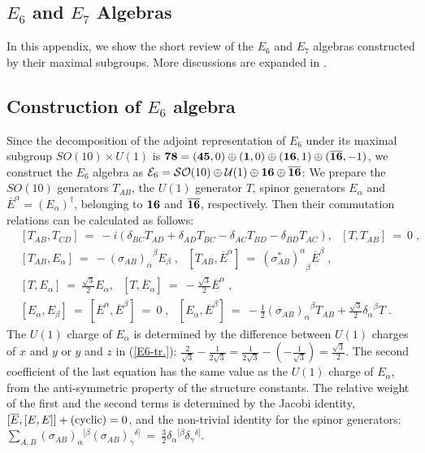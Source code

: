\documentclass[a4paper,11pt]{article}
\newcommand{\half}{\frac{1}{2}}
\newcommand{\ol}{\overline}
\begin{document}
{\begin{appendix}

\section{$E_6$ and $E_7$ Algebras} \label{e-algebra}

In this appendix, 
we show the short review of the $E_6$ and $E_7$ algebras 
constructed by their maximal subgroups.
More discussions are expanded in \cite{IKK2,KS,HN1}. 



\subsection{Construction of $E_6$ algebra}

Since the decomposition of the adjoint representation of $E_6$ under its
maximal subgroup $SO(10) \times U(1)$ is 
${\bf 78} = ({\bf 45},0) \oplus ({\bf 1},0)
\oplus({\bf 16},1)\oplus ({\bf \ol{16}},-1)$, 
we construct the $E_6$ algebra as 
${\cal E}_6 = {\cal SO}(10) \oplus {\cal U}(1) 
\oplus {\bf 16} \oplus {\bf \ol{16}}$: 
We prepare the $SO(10)$ generators $T_{AB}$, 
the $U(1)$ generator $T$, 
spinor generators $E_{\alpha}$ and 
$\ol{E}^{\alpha} = (E_{\alpha})^{\dagger}$,
belonging to ${\bf 16}$ and $\ol{\bf 16}$, respectively.
Then their commutation relations can be calculated 
as follows: 
\begin{align}
&[T_{AB} , T_{CD}] 
 \ = \ -i (\delta_{BC} T_{AD} + \delta_{AD} T_{BC}
    - \delta_{AC} T_{BD} - \delta_{BD} T_{AC}) , 
   \ \ \ [T, T_{AB}] \ = \ 0 \; , \nonumber \\
&[T_{AB} , E_{\alpha}] 
  \ = \ - {({\sigma_{AB}})_{\alpha}}^{\beta} E_{\beta} \; , 
\ \ \ [T_{AB},\ol{E}^{\alpha}] 
\ = \ {({\sigma^*_{AB}})^{\alpha}}_{\beta} \ol{E}^{\beta} \; ,
 \nonumber \\
&[T, E_{\alpha}] \ = \ \frac{\sqrt{3}}{2} E_{\alpha}, 
\ \ \  [T, \ol{E}_{\alpha}] \ = \ - \frac{\sqrt{3}}{2} \ol{E}^{\alpha}
 \; , \nonumber \\
&[E_{\alpha},E_{\beta}] 
  \ = \ [\ol{E}^{\alpha},\ol{E}^{\beta} ] \ = \ 0 \; , 
\ \ \  [E_{\alpha} ,\ol{E}^{\beta} ]
 \ = \ -\half {({\sigma_{AB}})_{\alpha}}^{\beta} T_{AB} 
   + \frac{\sqrt{3}}{2} {\delta_{\alpha}}^{\beta} T \; .
\end{align}
The $U(1)$ charge of $E_{\alpha}$ is determined by 
the difference between $U(1)$ charges 
of $x$ and $y$ or $y$ and $z$ in (\ref{E6-tr.}): 
$\frac{2}{\sqrt{3}} - \frac{1}{2\sqrt{3}} 
= \frac{1}{2\sqrt{3}} - (-\frac{1}{\sqrt{3}})= \frac{\sqrt{3}}{2}$.
The second coefficient of the last equation has 
the same value as the $U(1)$ charge of $E_{\alpha}$, from 
the anti-symmetric property of the structure constants. 
The relative weight of the first and the second terms  
is determined by the Jacobi identity, 
$[\ol{E},[E,E]] + {\rm (cyclic)} = 0$, 
and the non-trivial identity for 
the spinor generators:
$\sum_{A,B}({\sigma_{AB}})_{\alpha}{}^{[\beta}
 ({\sigma_{AB}})_{\gamma}{}^{\delta]}
  \ = \ \frac{3}{2} \delta_{\alpha}{}^{[\beta}
 \delta_{\gamma}{}^{\delta]}$.


\end{appendix}}
\end{document}
